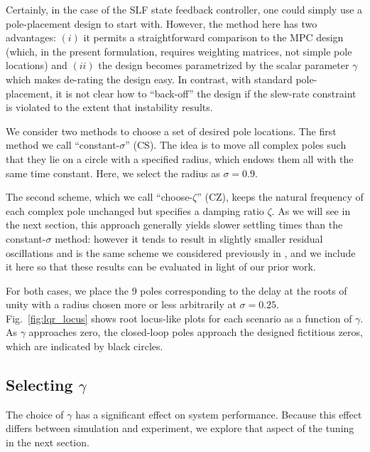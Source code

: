 \documentclass[twocolumn,twoside]{IEEEtran}
\begin{document}
Certainly, in the case of the SLF state feedback controller, one could simply use a pole-placement design to start with. However, the method here has two advantages: $(i)$ it permits a straightforward comparison to the MPC design (which, in the present formulation, requires weighting matrices, not simple pole locations) and $(ii)$ the design becomes parametrized by the scalar parameter $\gamma$ which makes de-rating the design easy. In contrast, with standard pole-placement, it is not clear how to ``back-off'' the design if the slew-rate constraint is violated to the extent that instability results. 

We consider two methods to choose a set of desired pole locations. The first method we call ``constant-$\sigma$'' (CS). The idea is to move all complex poles such that they lie on a circle with a specified radius, which endows them all with the same time constant. Here, we select the radius as $\sigma=0.9$.

The second scheme, which we call ``choose-$\zeta$'' (CZ), keeps the natural frequency of each complex pole unchanged but specifies a damping ratio $\zeta$. As we will see in the next section, this approach generally yields slower settling times than the constant-$\sigma$ method: however it tends to result in slightly smaller residual oscillations and is the same scheme we considered previously in \cite{braker_fast_2017, braker_application_2017}, and we include it here so that these results can be evaluated in light of our prior work.

For both cases, we place the 9 poles corresponding to the delay at the roots of unity with a radius chosen more or less arbitrarily at ${\sigma=0.25}$. Fig.~\ref{fig:lqr_locus} shows root locus-like plots for each scenario as a function of $\gamma$. As $\gamma$ approaches zero, the closed-loop poles approach the designed fictitious zeros, which are indicated by black circles. 

\subsection{Selecting $\gamma$}
The choice of $\gamma$ has a significant effect on system performance. Because this effect differs between simulation and experiment, we explore that aspect of the tuning in the next section.
\end{document}
